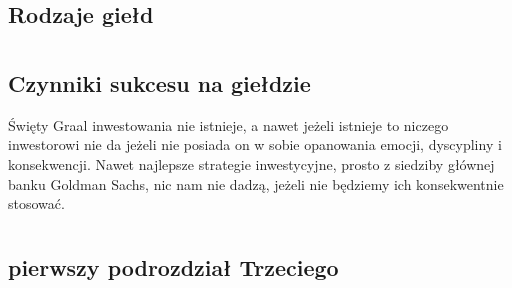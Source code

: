 \documentclass{report}
\begin{document}
\section {Rodzaje giełd}
\newpage
\chapter{}
\section{Czynniki sukcesu na giełdzie}
Święty Graal inwestowania nie istnieje, a nawet jeżeli istnieje to niczego inwestorowi nie da jeżeli nie posiada on w sobie opanowania emocji, dyscypliny i konsekwencji. Nawet najlepsze strategie inwestycyjne, prosto z siedziby głównej banku Goldman Sachs, nic nam nie dadzą, jeżeli nie będziemy ich konsekwentnie stosować.\cite{fib}
\newpage
\chapter{}
\section{pierwszy podrozdział Trzeciego}
\newpage


\end{document}
